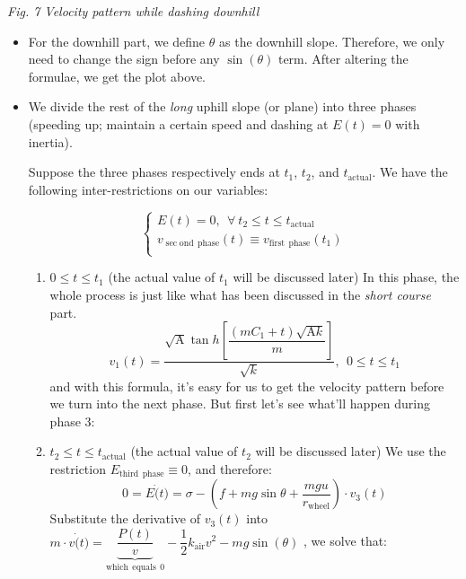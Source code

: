 \documentclass{article}
\begin{document}
\begin{itemize}
\begin{center}
						\small \textit{Fig. 7 Velocity pattern while dashing downhill}
					\end{center}

					\begin{itemize}
						\item For the downhill part, we define \(\theta\) as the downhill slope. Therefore, we only need to change the sign before any \(\sin\left(\theta\right)\) term. After altering the formulae, we get the plot above.
						\item We divide the rest of the \textit{long} uphill slope (or plane) into three phases (speeding up; maintain a certain speed and dashing at \(E(t)=0\) with inertia).

							Suppose the three phases respectively ends at \(t_1\), \(t_2\), and \(t_{\mathrm{actual}}\). We have the following inter-restrictions on our variables:

							$$
							\begin{cases}
								E\left( t \right) =0,\:\:\forall \:t_2\le t\le t_{\mathrm{actual}}\\
								v_{\sec\mathrm{ond}\:\:\mathrm{phase}}\left( t \right) \equiv v_{\mathrm{first}\:\:\mathrm{phase}}\left( t_1 \right)\\
							\end{cases}
							$$
							\begin{enumerate}
								\item \(0\leq t\leq t_1\) (the actual value of \(t_1\) will be discussed later)
									In this phase, the whole process is just like what has been discussed in the \textit{short course} part.
									\[v_1(t)=\dfrac{\sqrt{\mathrm{A}} \tan  h \left[\dfrac{\left(m C _1+t\right)\sqrt{\mathrm{A}k}}{m}\right]}{\sqrt{ k }},\:\:0\leq t\leq t_1\]
									and with this formula, it's easy for us to get the velocity pattern before we turn into the next phase. But first let's see what'll happen during phase 3:
								\item \(t_2\leq t\leq t_{\mathrm{actual}}\) (the actual value of \(t_2\) will be discussed later)
									We use the restriction \(E_{\mathrm{third\:\:phase}}\equiv 0\), and therefore:
									\[0=E \dot(t)=\sigma-\left(f+mg\sin\theta+\dfrac{mgu}{r_{\mathrm{wheel}}}\right)\cdot v_3(t)\]
									Substitute the derivative of \(v_3(t)\) into \(m \cdot v\dot(t)=\underset{\mathrm{which\:\:equals\:\:}0}{\underbrace{\dfrac{P (t)}{v}}}-\dfrac{1}{2} k_{\mathrm{air}} v^2-mg\sin\left(\theta\right)\)
									, we solve that:


\end{enumerate}
\end{itemize}
\end{itemize}
\end{document}
